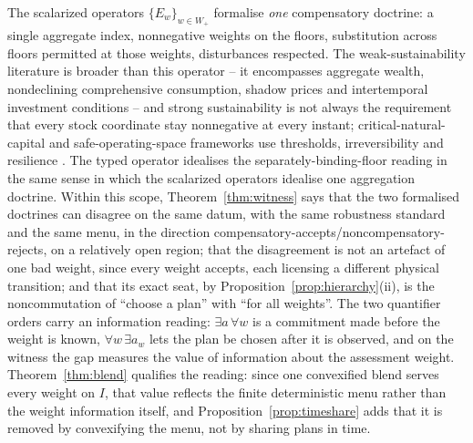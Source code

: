 \documentclass[preprint,11pt,authoryear]{elsarticle}
\theoremstyle{definition}
\theoremstyle{remark}
\newcommand{\Wp}{W_+}
\begin{document}
The scalarized operators $\{E_w\}_{w\in\Wp}$ formalise \emph{one} compensatory doctrine: a single aggregate index, nonnegative weights on the floors, substitution across floors permitted at those weights, disturbances respected. The weak-sustainability literature is broader than this operator -- it encompasses aggregate wealth, nondeclining comprehensive consumption, shadow prices and intertemporal investment conditions \citep{Solow1974,Asheim1994,DasguptaMaler2000,Neumayer2013} -- and strong sustainability is not always the requirement that every stock coordinate stay nonnegative at every instant; critical-natural-capital and safe-operating-space frameworks use thresholds, irreversibility and resilience \citep{Ekins2003,Rockstrom2009,Raworth2012,DoyenGajardo2020}. The typed operator idealises the separately-binding-floor reading in the same sense in which the scalarized operators idealise one aggregation doctrine. Within this scope, Theorem~\ref{thm:witness} says that the two formalised doctrines can disagree on the same datum, with the same robustness standard and the same menu, in the direction compensatory-accepts/noncompensatory-rejects, on a relatively open region; that the disagreement is not an artefact of one bad weight, since every weight accepts, each licensing a different physical transition; and that its exact seat, by Proposition~\ref{prop:hierarchy}(ii), is the noncommutation of ``choose a plan'' with ``for all weights''. The two quantifier orders carry an information reading: $\exists a\,\forall w$ is a commitment made before the weight is known, $\forall w\,\exists a_w$ lets the plan be chosen after it is observed, and on the witness the gap measures the value of information about the assessment weight. Theorem~\ref{thm:blend} qualifies the reading: since one convexified blend serves every weight on $I$, that value reflects the finite deterministic menu rather than the weight information itself, and Proposition~\ref{prop:timeshare} adds that it is removed by convexifying the menu, not by sharing plans in time.
\end{document}
